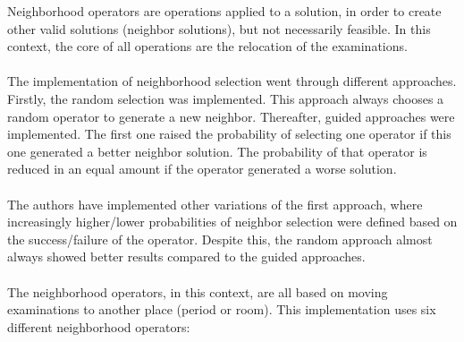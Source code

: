 Neighborhood operators are operations applied to a solution, in order to create other valid solutions (neighbor solutions), but not necessarily feasible. In this context, the core of all operations are the relocation of the examinations.\\
\\
The implementation of neighborhood selection went through different approaches. Firstly, the random selection was implemented. This approach always chooses a random operator to generate a new neighbor. Thereafter, guided approaches were implemented. The first one raised the probability of selecting one operator if this one generated a better neighbor solution. The probability of that operator is reduced in an equal amount if the operator generated a worse solution.\\
\\
The authors have implemented other variations of the first approach, where increasingly higher/lower probabilities of neighbor selection were defined based on the success/failure of the operator. Despite this, the random approach almost always showed better results compared to the guided approaches.\\
\\
The neighborhood operators, in this context, are all based on moving examinations to another place (period or room). This implementation uses six different neighborhood operators:
\\
